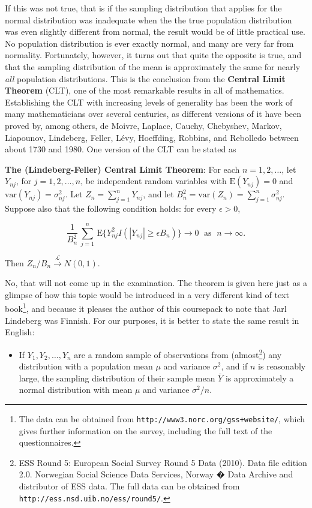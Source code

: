 \documentclass[11pt,a4paper,openany]{book}
\providecommand{\tightlist}{%
  \setlength{\itemsep}{0pt}\setlength{\parskip}{0pt}}
\let\rmarkdownfootnote\footnote%
\def\footnote{\protect\rmarkdownfootnote}
\begin{document}
If this was not true, that is if the sampling distribution that applies
for the normal distribution was inadequate when the the true population
distribution was even slightly different from normal, the result would
be of little practical use. No population distribution is ever exactly
normal, and many are very far from normality. Fortunately, however, it
turns out that quite the opposite is true, and that the sampling
distribution of the mean is approximately the same for nearly \emph{all}
population distributions. This is the conclusion from the
\textbf{Central Limit Theorem} (CLT), one of the most remarkable results
in all of mathematics. Establishing the CLT with increasing levels of
generality has been the work of many mathematicians over several
centuries, as different versions of it have been proved by, among
others, de Moivre, Laplace, Cauchy, Chebyshev, Markov, Liapounov,
Lindeberg, Feller, Lévy, Hoeffding, Robbins, and Rebolledo between about
1730 and 1980. One version of the CLT can be stated as

\textbf{The (Lindeberg-Feller) Central Limit Theorem}: For each
\(n=1,2,\dots\), let \(Y_{nj}\), for \(j=1,2,\dots,n\), be independent
random variables with \(\text{E}(Y_{nj})=0\) and
\(\text{var}(Y_{nj})=\sigma^{2}_{nj}\). Let
\(Z_{n}=\sum_{j=1}^{n} Y_{nj}\), and let
\(B^{2}_{n}=\text{var}(Z_{n})=\sum_{j=1}^{n} \sigma^{2}_{nj}\). Suppose
also that the following condition holds: for every \(\epsilon>0\),

\begin{equation}\frac{1}{B_{n}^{2}}\,
\sum_{j=1}^{n} \, \text{E}\{ Y_{nj}^{2} I(|Y_{nj}|\ge \epsilon B_{n})\}
\rightarrow 0 \; \text{  as  } \; n\rightarrow \infty.
\label{eq:lindeberg}\end{equation}

Then \(Z_{n}/B_{n} \stackrel{\mathcal{L}}{\longrightarrow} N(0,1)\).

No, that will not come up in the examination. The theorem is given here
just as a glimpse of how this topic would be introduced in a very
different kind of text book\footnote{The data can be obtained from
  \texttt{http://www3.norc.org/gss+website/}, which gives further
  information on the survey, including the full text of the
  questionnaires.}, and because it pleases the author of this coursepack
to note that Jarl Lindeberg was Finnish. For our purposes, it is better
to state the same result in English:

\begin{itemize}
\tightlist
\item
  If \(Y_{1}, Y_{2}, \dots, Y_{n}\) are a random sample of observations
  from (almost\footnote{ESS Round 5: European Social Survey Round 5 Data
    (2010). Data file edition 2.0. Norwegian Social Science Data
    Services, Norway � Data Archive and distributor of ESS data. The
    full data can be obtained from
    \texttt{http://ess.nsd.uib.no/ess/round5/}.}) any distribution with
  a population mean \(\mu\) and variance \(\sigma^{2}\), and if \(n\) is
  reasonably large, the sampling distribution of their sample mean
  \(\bar{Y}\) is approximately a normal distribution with mean \(\mu\)
  and variance \(\sigma^{2}/n\).
\end{itemize}
\end{document}
